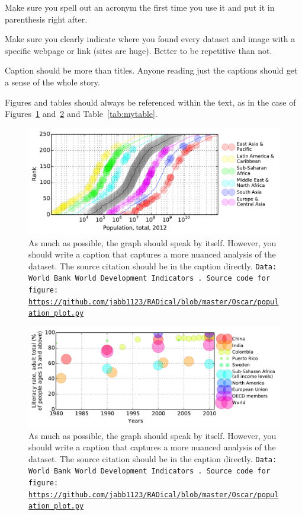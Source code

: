 \documentclass[11pt, twocolumn]{article}
\begin{document}
Make sure you spell out an acronym the first time you use it and put it in parenthesis right after.

Make sure you clearly indicate where you found every dataset and image with a specific webpage or link (sites are huge). Better to be repetitive than not.

Caption should be more than titles. Anyone reading just the captions should get a sense of the whole story.

Figures and tables should always be referenced within the text, as in the case of Figures~\ref{fig:myfigure} and~\ref{fig:myfigure2} and Table~\ref{tab:mytable}.

\begin{figure}
\centering 
\includegraphics[width=\textwidth]{Populati2012.pdf}\caption{\label{fig:myfigure}As much as possible, the graph should speak by itself. However, you should write a caption that captures a more nuanced analysis of the dataset. The source citation should be in the caption directly. {\tt Data: World Bank World Development Indicators~\cite{wdi}. Source code for figure: \url{https://github.com/jabb1123/RADical/blob/master/Oscar/population_plot.py}}} 
\end{figure}

\begin{figure}
\centering 
\includegraphics[width=\textwidth]{Literacy.pdf}\caption{\label{fig:myfigure2}As much as possible, the graph should speak by itself. However, you should write a caption that captures a more nuanced analysis of the dataset. The source citation should be in the caption directly. {\tt Data: World Bank World Development Indicators~\cite{wdi}. Source code for figure: \url{https://github.com/jabb1123/RADical/blob/master/Oscar/population_plot.py}}} 
\end{figure}
\end{document}
